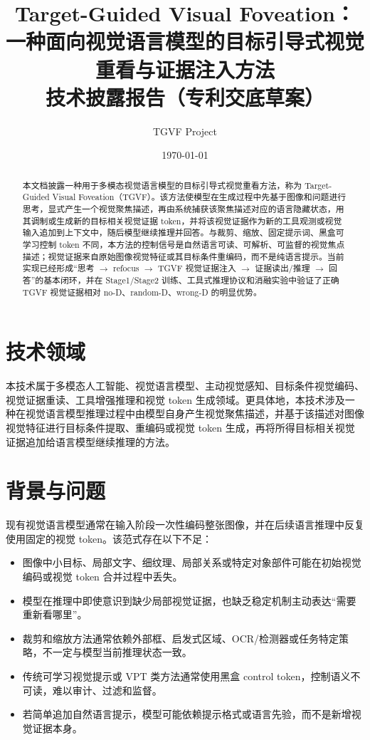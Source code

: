 \documentclass[10pt,twocolumn]{ctexart}
\title{\bfseries Target-Guided Visual Foveation：\\
一种面向视觉语言模型的目标引导式视觉重看与证据注入方法\\
\large 技术披露报告（专利交底草案）}
\author{TGVF Project}
\date{\today}
\begin{document}
\maketitle

\begin{abstract}
本文档披露一种用于多模态视觉语言模型的目标引导式视觉重看方法，称为 Target-Guided Visual Foveation（TGVF）。该方法使模型在生成过程中先基于图像和问题进行思考，显式产生一个视觉聚焦描述，再由系统捕获该聚焦描述对应的语言隐藏状态，用其调制或生成新的目标相关视觉证据 token，并将该视觉证据作为新的工具观测或视觉输入追加到上下文中，随后模型继续推理并回答。与裁剪、缩放、固定提示词、黑盒可学习控制 token 不同，本方法的控制信号是自然语言可读、可解析、可监督的视觉焦点描述；视觉证据来自原始图像视觉特征或其目标条件重编码，而不是纯语言提示。当前实现已经形成“思考 $\rightarrow$ refocus $\rightarrow$ TGVF 视觉证据注入 $\rightarrow$ 证据读出/推理 $\rightarrow$ 回答”的基本闭环，并在 Stage1/Stage2 训练、工具式推理协议和消融实验中验证了正确 TGVF 视觉证据相对 no-D、random-D、wrong-D 的明显优势。
\end{abstract}

\section{技术领域}

本技术属于多模态人工智能、视觉语言模型、主动视觉感知、目标条件视觉编码、视觉证据重读、工具增强推理和视觉 token 生成领域。更具体地，本技术涉及一种在视觉语言模型推理过程中由模型自身产生视觉聚焦描述，并基于该描述对图像视觉特征进行目标条件提取、重编码或视觉 token 生成，再将所得目标相关视觉证据追加给语言模型继续推理的方法。

\section{背景与问题}

现有视觉语言模型通常在输入阶段一次性编码整张图像，并在后续语言推理中反复使用固定的视觉 token。该范式存在以下不足：

\begin{itemize}
  \item 图像中小目标、局部文字、细纹理、局部关系或特定对象部件可能在初始视觉编码或视觉 token 合并过程中丢失。
  \item 模型在推理中即使意识到缺少局部视觉证据，也缺乏稳定机制主动表达“需要重新看哪里”。
  \item 裁剪和缩放方法通常依赖外部框、启发式区域、OCR/检测器或任务特定策略，不一定与模型当前推理状态一致。
  \item 传统可学习视觉提示或 VPT 类方法通常使用黑盒 control token，控制语义不可读，难以审计、过滤和监督。
  \item 若简单追加自然语言提示，模型可能依赖提示格式或语言先验，而不是新增视觉证据本身。
\end{itemize}
\end{document}
